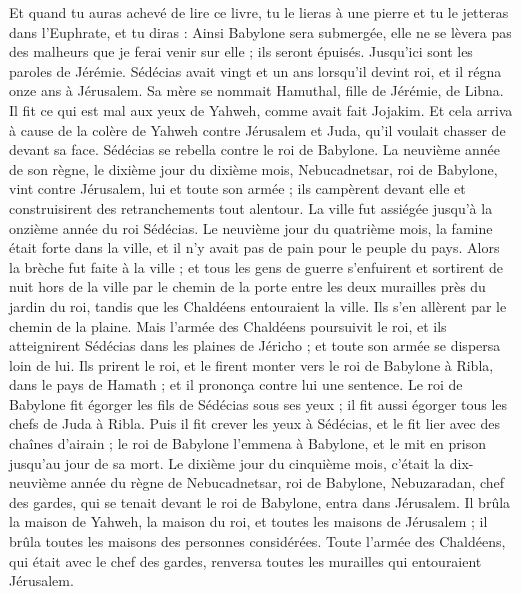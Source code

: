 \begin{multicols}{2}
Et quand tu auras achevé de lire ce livre, tu le lieras à une pierre et tu le jetteras dans l'Euphrate,
et tu diras : Ainsi Babylone sera submergée, elle ne se lèvera pas des malheurs que je ferai venir sur elle ; ils seront épuisés. Jusqu'ici sont les paroles de Jérémie.
\VerseOne{}Sédécias avait vingt et un ans lorsqu'il devint roi, et il régna onze ans à Jérusalem. Sa mère se nommait Hamuthal, fille de Jérémie, de Libna.
Il fit ce qui est mal aux yeux de Yahweh, comme avait fait Jojakim.
Et cela arriva à cause de la colère de Yahweh contre Jérusalem et Juda, qu'il voulait chasser de devant sa face. Sédécias se rebella contre le roi de Babylone.
La neuvième année de son règne, le dixième jour du dixième mois, Nebucadnetsar, roi de Babylone, vint contre Jérusalem, lui et toute son armée ; ils campèrent devant elle et construisirent des retranchements tout alentour.
La ville fut assiégée jusqu'à la onzième année du roi Sédécias.
Le neuvième jour du quatrième mois, la famine était forte dans la ville, et il n'y avait pas de pain pour le peuple du pays.
Alors la brèche fut faite à la ville ; et tous les gens de guerre s'enfuirent et sortirent de nuit hors de la ville par le chemin de la porte entre les deux murailles près du jardin du roi, tandis que les Chaldéens entouraient la ville. Ils s'en allèrent par le chemin de la plaine.
Mais l'armée des Chaldéens poursuivit le roi, et ils atteignirent Sédécias dans les plaines de Jéricho ; et toute son armée se dispersa loin de lui.
Ils prirent le roi, et le firent monter vers le roi de Babylone à Ribla, dans le pays de Hamath ; et il prononça contre lui une sentence.
Le roi de Babylone fit égorger les fils de Sédécias sous ses yeux ; il fit aussi égorger tous les chefs de Juda à Ribla.
Puis il fit crever les yeux à Sédécias, et le fit lier avec des chaînes d'airain ; le roi de Babylone l'emmena à Babylone, et le mit en prison jusqu'au jour de sa mort.
Le dixième jour du cinquième mois, c'était la dix-neuvième année du règne de Nebucadnetsar, roi de Babylone, Nebuzaradan, chef des gardes, qui se tenait devant le roi de Babylone, entra dans Jérusalem.
Il brûla la maison de Yahweh, la maison du roi, et toutes les maisons de Jérusalem ; il brûla toutes les maisons des personnes considérées.
Toute l'armée des Chaldéens, qui était avec le chef des gardes, renversa toutes les murailles qui entouraient Jérusalem.

\end{multicols}
